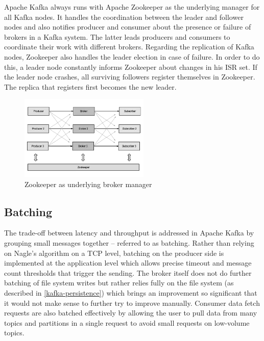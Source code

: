 Apache Kafka always runs with Apache Zookeeper as the underlying manager for all
Kafka nodes. It handles the coordination between the leader and follower nodes
and also notifies producer and consumer about the presence or failure of brokers in a
Kafka system. The latter leads producers and consumers to coordinate their work
with different brokers. Regarding the replication of Kafka nodes, Zookeeper
also handles the leader election in case of failure. In order to do this, a leader node
constantly informs Zookeeper about changes in his ISR set. If the leader node
crashes, all surviving followers register themselves in Zookeeper. The replica that
registers first becomes the new leader. \cite{kafka-wiki-replication}
\cite{ArtKafkaInfoQ} \cite{apacheZookeeper}

\begin{figure}[H]
    \centering
    \includegraphics[width=0.55\textwidth]{images/kafka-replication-zookeeper.png}
    \caption{Zookeeper as underlying broker manager \cite{ArtKafkaInfoQ}}
    \label{fig:the-log}
\end{figure}

\subsection{Batching}
\label{intro-kafka-components-batching}

The trade-off between latency and throughput is addressed in Apache Kafka by
grouping small messages together -- referred to as batching. Rather than relying
on Nagle's algorithm on a TCP level, batching on the producer side is implemented
at the application level which allows precise timeout and message count
thresholds that trigger the sending. The broker itself does not do further batching
of file system writes but rather relies fully on the file system (as described in
\ref{kafka-persistence}) which brings an improvement so significant that it would
not make sense to further try to improve manually. Consumer data fetch requests
are also batched effectively by allowing the user to pull data from many
topics and partitions in a single request to avoid small requests on low-volume
topics. \cite{goodhope2012building}

